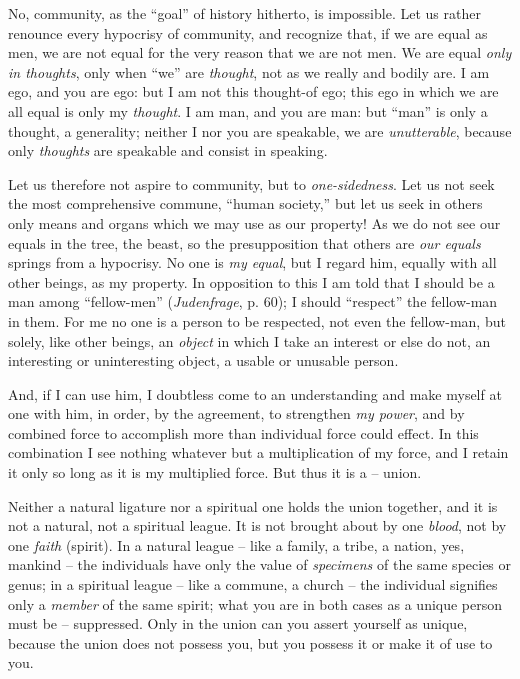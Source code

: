 No, community, as the ``goal'' of history hitherto, is impossible. Let us 
rather renounce every hypocrisy of community, and recognize that, if we are 
equal as men, we are not equal for the very reason that we are not men. We are 
equal \textit{only in thoughts}, only when ``we'' are \textit{thought}, not 
as we really and bodily are. I am ego, and you are ego: but I am not this 
thought-of ego; this ego in which we are all equal is only my 
\textit{thought}. I am man, and you are man: but ``man'' is only a thought, 
a generality; neither I nor you are speakable, we are \textit{unutterable}, 
because only \textit{thoughts} are speakable and consist in speaking.

Let us therefore not aspire to community, but to \textit{one-sidedness}. Let 
us not seek the most comprehensive commune, ``human society,'' but let us 
seek in others only means and organs which we may use as our property! As we 
do not see our equals in the tree, the beast, so the presupposition that 
others are \textit{our equals} springs from a hypocrisy. No one is \textit{my 
equal}, but I regard him, equally with all other beings, as my property. In 
opposition to this I am told that I should be a man among ``fellow-men'' 
(\textit{Judenfrage}, p. 60); I should ``respect'' the fellow-man in them. 
For me no one is a person to be respected, not even the fellow-man, but 
solely, like other beings, an \textit{object} in which I take an interest or 
else do not, an interesting or uninteresting object, a usable or unusable 
person.

And, if I can use him, I doubtless come to an understanding and make myself at 
one with him, in order, by the agreement, to strengthen \textit{my power}, and 
by combined force to accomplish more than individual force could effect. In 
this combination I see nothing whatever but a multiplication of my force, and 
I retain it only so long as it is my multiplied force. But thus it is a -- 
union.

Neither a natural ligature nor a spiritual one holds the union together, and 
it is not a natural, not a spiritual league. It is not brought about by one 
\textit{blood}, not by one \textit{faith} (spirit). In a natural league -- 
like a family, a tribe, a nation, yes, mankind -- the individuals have only 
the value of \textit{specimens} of the same species or genus; in a spiritual 
league -- like a commune, a church -- the individual signifies only a 
\textit{member} of the same spirit; what you are in both cases as a unique 
person must be -- suppressed. Only in the union can you assert yourself as 
unique, because the union does not possess you, but you possess it or make it 
of use to you.

